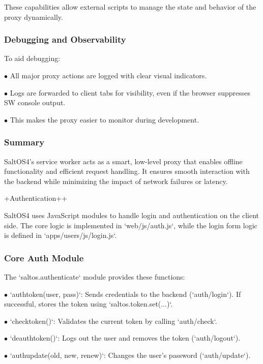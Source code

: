 \documentclass[a4paper]{article}
\begin{document}
These capabilities allow external scripts to manage the state and behavior of the proxy dynamically.

\hypertarget{toc40}{}
\subsubsection{Debugging and Observability}

To aid debugging:

\begin{compactitem}
\item[\color{myblue}$\bullet$] All major proxy actions are logged with clear visual indicators.
\item[\color{myblue}$\bullet$] Logs are forwarded to client tabs for visibility, even if the browser suppresses SW console output.
\item[\color{myblue}$\bullet$] This makes the proxy easier to monitor during development.
\end{compactitem}

\hypertarget{toc41}{}
\subsubsection{Summary}

SaltOS4’s service worker acts as a smart, low-level proxy that enables offline functionality and efficient request handling. It ensures smooth interaction with the backend while minimizing the impact of network failures or latency.

+Authentication++

SaltOS4 uses JavaScript modules to handle login and authentication on the client side. The core logic is implemented in `web/js/auth.js`, while the login form logic is defined in `apps/users/js/login.js`.

\hypertarget{toc42}{}
\subsubsection{Core Auth Module}

The `saltos.authenticate` module provides these functions:

\begin{compactitem}
\item[\color{myblue}$\bullet$] `authtoken(user, pass)`: Sends credentials to the backend (`auth/login`). If successful, stores the token using `saltos.token.set(...)`.
\item[\color{myblue}$\bullet$] `checktoken()`: Validates the current token by calling `auth/check`.
\item[\color{myblue}$\bullet$] `deauthtoken()`: Logs out the user and removes the token (`auth/logout`).
\item[\color{myblue}$\bullet$] `authupdate(old, new, renew)`: Changes the user's password (`auth/update`).
\end{compactitem}
\end{document}
